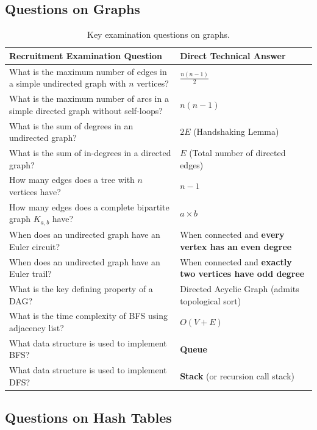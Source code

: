 \subsection{Questions on Graphs}

\begin{table}[htbp]
\centering
\small
\begin{tabularx}{\textwidth}{p{8cm} X}
\toprule
\textbf{Recruitment Examination Question} & \textbf{Direct Technical Answer} \\
\midrule
What is the maximum number of edges in a simple undirected graph with $n$ vertices? & $\frac{n(n-1)}{2}$ \\
What is the maximum number of arcs in a simple directed graph without self-loops? & $n(n-1)$ \\
What is the sum of degrees in an undirected graph? & $2E$ (Handshaking Lemma) \\
What is the sum of in-degrees in a directed graph? & $E$ (Total number of directed edges) \\
How many edges does a tree with $n$ vertices have? & $n - 1$ \\
How many edges does a complete bipartite graph $K_{a,b}$ have? & $a \times b$ \\
When does an undirected graph have an Euler circuit? & When connected and \textbf{every vertex has an even degree} \\
When does an undirected graph have an Euler trail? & When connected and \textbf{exactly two vertices have odd degree} \\
What is the key defining property of a DAG? & Directed Acyclic Graph (admits topological sort) \\
What is the time complexity of BFS using adjacency list? & $O(V + E)$ \\
What data structure is used to implement BFS? & \textbf{Queue} \\
What data structure is used to implement DFS? & \textbf{Stack} (or recursion call stack) \\
\bottomrule
\end{tabularx}
\caption{Key examination questions on graphs.}
\end{table}

\subsection{Questions on Hash Tables}

